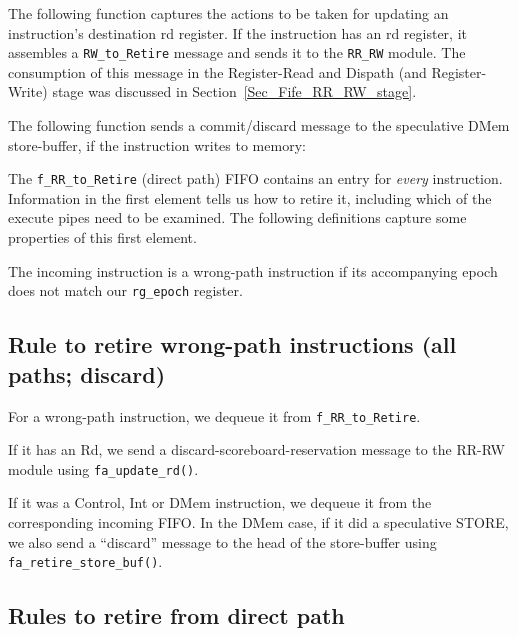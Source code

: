 The following function captures the actions to be taken for updating
an instruction's destination rd register. If the instruction has an rd
register, it assembles a \verb|RW_to_Retire| message and sends it to
the \verb|RR_RW| module.  The consumption of this message in the
Register-Read and Dispath (and Register-Write) stage was discussed in
Section~\ref{Sec_Fife_RR_RW_stage}.


The following function sends a commit/discard message to the
speculative DMem store-buffer, if the instruction writes to memory:


The \verb|f_RR_to_Retire| (direct path) FIFO contains an entry for
\emph{every} instruction.  Information in the first element tells us
how to retire it, including which of the execute pipes need to be
examined.  The following definitions capture some properties of this
first element.


The incoming instruction is a wrong-path instruction if its
accompanying epoch does not match our \verb|rg_epoch| register.


\subsection{Rule to retire wrong-path instructions (all paths; discard)}

For a wrong-path instruction, we dequeue it from \verb|f_RR_to_Retire|.

If it has an Rd, we send a discard-scoreboard-reservation message to
the RR-RW module using \verb|fa_update_rd()|.

If it was a Control, Int or DMem instruction, we dequeue it from the
corresponding incoming FIFO.  In the DMem case, if it did a
speculative STORE, we also send a ``discard'' message to the head of
the store-buffer using \verb|fa_retire_store_buf()|.



\subsection{Rules to retire from direct path}


